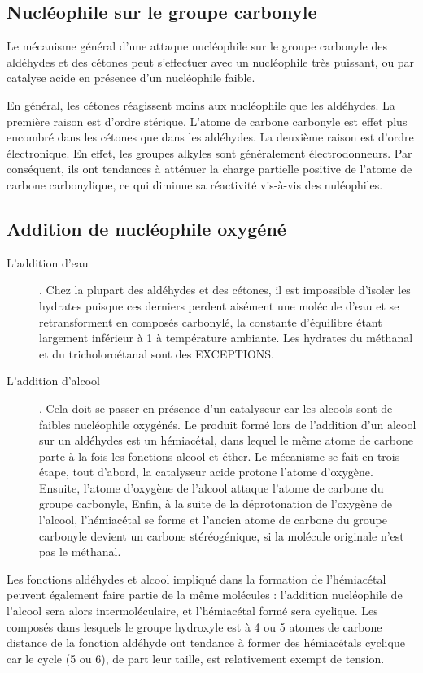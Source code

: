\subsection{Nucléophile sur le groupe carbonyle}

Le mécanisme général d'une attaque nucléophile sur le groupe carbonyle des aldéhydes et des cétones peut s'effectuer avec un nucléophile très puissant, ou par catalyse acide en présence d'un nucléophile faible.

En général, les cétones réagissent moins aux nucléophile que les aldéhydes.
La première raison est d'ordre stérique.
L'atome de carbone carbonyle est effet plus encombré dans les cétones que dans les aldéhydes.
La deuxième raison est d'ordre électronique.
En effet, les groupes alkyles sont généralement électrodonneurs.
Par conséquent, ils ont tendances à atténuer la charge partielle positive de l'atome de carbone carbonylique, ce qui diminue sa réactivité vis-à-vis des nuléophiles.

\subsection{Addition de nucléophile oxygéné}

\begin{description}

  \item[L'addition d'eau].
    Chez la plupart des aldéhydes et des cétones, il est impossible d'isoler les hydrates puisque ces derniers perdent aisément une molécule d'eau et se retransforment en composés carbonylé, la constante d'équilibre étant largement inférieur à 1 à température ambiante.
    Les hydrates du méthanal et du tricholoroétanal sont des EXCEPTIONS.

  \item[L'addition d'alcool].
    Cela doit se passer en présence d'un catalyseur car les alcools sont de faibles nucléophile oxygénés.
    Le produit formé lors de l'addition d'un alcool sur un aldéhydes est un hémiacétal, dans lequel le même atome de carbone parte à la fois les fonctions alcool et éther.
    Le mécanisme se fait en trois étape, tout d'abord, la catalyseur acide protone l'atome d'oxygène.
    Ensuite, l'atome d'oxygène de l'alcool attaque l'atome de carbone du groupe carbonyle, Enfin, à la suite de la déprotonation de l'oxygène de l'alcool, l'hémiacétal se forme et l'ancien atome de carbone du groupe carbonyle devient un carbone stéréogénique, si la molécule originale n'est pas le méthanal.
\end{description}
Les fonctions aldéhydes et alcool impliqué dans la formation de l'hémiacétal peuvent également faire partie de la même molécules : l'addition nucléophile de l'alcool sera alors intermoléculaire, et l'hémiacétal formé sera cyclique.
Les composés dans lesquels le groupe hydroxyle est à  4 ou 5 atomes de carbone distance de la fonction aldéhyde ont tendance à former des hémiacétals cyclique car le cycle (5 ou 6), de part leur taille, est relativement exempt de tension.


